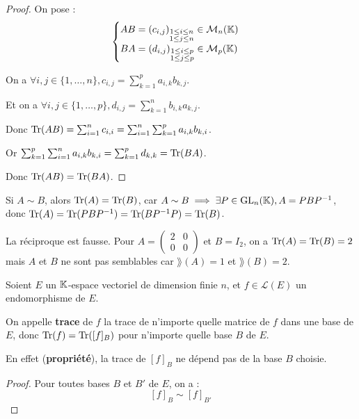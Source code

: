 \documentclass[12pt, a4paper]{report}
\begin{document}
\begin{proof}
    On pose :
    $$\begin{cases}
    AB = (c_{i,j})_{\substack{1 \le i \le n \\ 1 \le j \le n}} \in \mathcal M_n(\mathbb{K}) \\
    BA = (d_{i,j})_{\substack{1 \le i \le p \\ 1 \le j \le p}} \in \mathcal M_p(\mathbb{K})
    \end{cases}$$

    On a $\forall i,j \in \{1,\dots,n\}, c_{i,j} = \sum_{k=1}^p a_{i,k} b_{k,j}$.

    Et on a $\forall i,j \in \{1,\dots,p\}, d_{i,j} = \sum_{k=1}^n b_{i,k} a_{k,j}$.
    
    Donc $\mathrm{Tr}(AB) = \sum_{i=1}^n c_{i,i} = \sum_{i=1}^n \sum_{k=1}^p a_{i,k} b_{k,i}$.

    Or $\sum_{k=1}^p \sum_{i=1}^n a_{i,k} b_{k,i} = \sum_{k=1}^p d_{k,k} = \mathrm{Tr}(BA)$.

    Donc $\mathrm{Tr}(AB) = \mathrm{Tr}(BA)$.
\end{proof}

\begin{consequence}
    Si $A \sim B$, alors $\mathrm{Tr}(A) = \mathrm{Tr}(B)$, car $A \sim B \implies \exists P \in \mathrm{GL}_n(\mathbb{K}), A = P B P^{-1}$, donc $\mathrm{Tr}(A) = \mathrm{Tr}(P B P^{-1}) = \mathrm{Tr}(B P^{-1} P) = \mathrm{Tr}(B)$.
\end{consequence}

\begin{attention}
    La réciproque est fausse. Pour $A = \left(\begin{matrix} 2 & 0 \\ 0 & 0 \end{matrix}\right)$ et $B = I_2$, on a $\mathrm{Tr}(A) = \mathrm{Tr}(B) = 2$ mais $A$ et $B$ ne sont pas semblables car $\rang(A) = 1$ et $\rang(B) = 2$.
\end{attention}

\begin{definition}
    Soient $E$ un $\mathbb{K}$-espace vectoriel de dimension finie $n$, et $f \in \mathcal L(E)$ un endomorphisme de $E$.

    On appelle \textbf{trace} de $f$ la trace de n'importe quelle matrice de $f$ dans une base de $E$, donc $\mathrm{Tr}(f) = \mathrm{Tr}([f]_B)$ pour n'importe quelle base $B$ de $E$.

    En effet (\textbf{propriété}), la trace de $[f]_B$ ne dépend pas de la base $B$ choisie.
\end{definition}

\begin{proof}
    Pour toutes bases $B$ et $B'$ de $E$, on a :
    $$[f]_B \sim [f]_{B'}$$
\end{proof}
\end{document}
